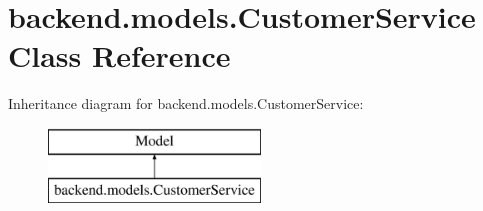\hypertarget{classbackend_1_1models_1_1_customer_service}{}\section{backend.\+models.\+Customer\+Service Class Reference}
\label{classbackend_1_1models_1_1_customer_service}
Inheritance diagram for backend.\+models.\+Customer\+Service\+:\begin{figure}[H]
\begin{center}
\leavevmode
\includegraphics[height=2.000000cm]{classbackend_1_1models_1_1_customer_service}
\end{center}
\end{figure}
